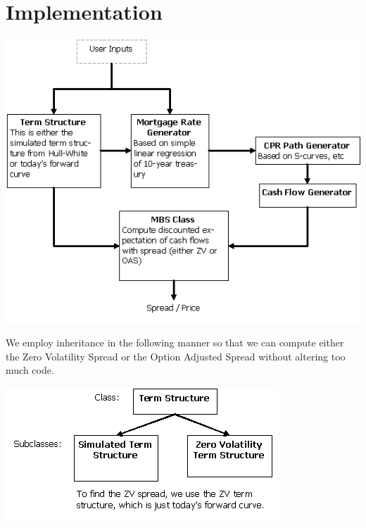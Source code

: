 \documentclass[10pt,letterpaper]{article}
\begin{document}
\section{Implementation}
\begin{center}
\includegraphics[scale=0.7]{classes.png}\\
\end{center}
We employ inheritance in the following manner so that we can compute either the Zero Volatility Spread or the Option Adjusted Spread without altering too much code.
\begin{center}
\includegraphics[scale=0.7]{inheritance.png}
\end{center}
\end{document}

